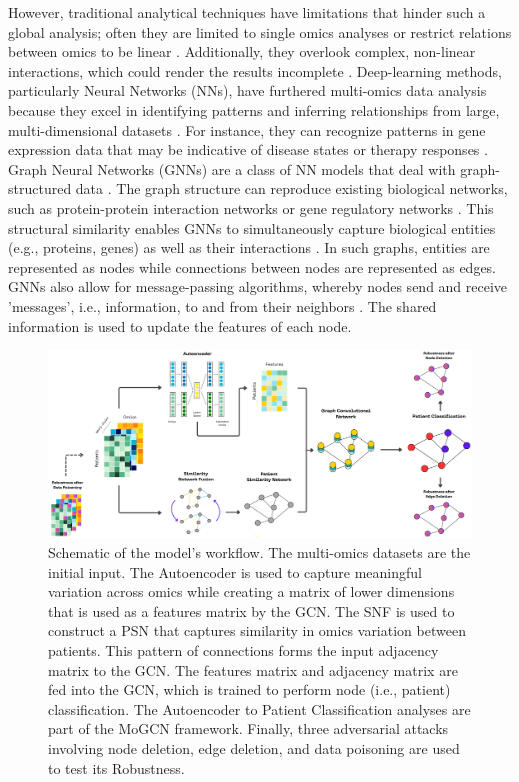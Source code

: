 \documentclass[unnumsec,webpdf,modern,large]{oup-authoring-template}
\theoremstyle{thmstyleone}%
\theoremstyle{thmstyletwo}%
\theoremstyle{thmstylethree}%
\begin{document}
\par However, traditional analytical techniques have limitations that hinder such a global analysis; often they are limited to single omics analyses or restrict relations between omics to be linear \cite{Wu2021, stahlschmidt2022multimodal, singh2019diablo}. Additionally, they overlook complex, non-linear interactions, which could render the results incomplete \cite{picard2021integration, reel2021using, tolani2021big}. Deep-learning methods, particularly Neural Networks (NNs), have furthered multi-omics data analysis because they excel in identifying patterns and inferring relationships from large, multi-dimensional datasets \cite{wen2023deep, Brombacher2022, leng2022benchmark}. For instance, they can recognize patterns in gene expression data that may be indicative of disease states or therapy responses \cite{tong2020deep, huang2019salmon, nicora2020integrated}. Graph Neural Networks (GNNs) are a class of NN models that deal with graph-structured data \cite{cui2022graph}. The graph structure can reproduce existing biological networks, such as protein-protein interaction networks or gene regulatory networks \cite{Milano2023}. This structural similarity enables GNNs to simultaneously capture biological entities (e.g., proteins, genes) as well as their interactions \cite{Zhu2023, Wang2020, wang2020moronet}. In such graphs, entities are represented as nodes while connections between nodes are represented as edges. GNNs also allow for message-passing algorithms, whereby nodes send and receive 'messages', i.e., information, to and from their neighbors \cite{Li2022Pan, tang2022graph}. The shared information is used to update the features of each node. 

\begin{figure}[!t]%
\centering
\includegraphics[width=\textwidth]{Robustness after Data Poisoning(1).png}
\caption{Schematic of the model's workflow. The multi-omics datasets are the initial input. The Autoencoder is used to capture meaningful variation across omics while creating a matrix of lower dimensions that is used as a features matrix by the GCN. The SNF is used to construct a PSN that captures similarity in omics variation between patients. This pattern of connections forms the input adjacency matrix to the GCN. The features matrix and adjacency matrix are fed into the GCN, which is trained to perform node (i.e., patient) classification. The Autoencoder to Patient Classification analyses are part of the MoGCN framework. Finally, three adversarial attacks involving node deletion, edge deletion, and data poisoning are used to test its Robustness.}\label{fig2}
\end{figure}
\end{document}
